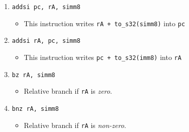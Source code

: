 \documentclass{article}
\begin{document}
\begin{itemize}
\begin{enumerate}
			\item \texttt{addsi pc, rA, simm8}
				\begin{itemize}
				\item This instruction writes \texttt{rA + to\_s32(simm8)}
					into \texttt{pc}
				\end{itemize}
			\item \texttt{addsi rA, pc, simm8}
				\begin{itemize}
				\item This instruction writes \texttt{pc + to\_s32(imm8)}
					into \texttt{rA}
				\end{itemize}

			\item \texttt{bz rA, simm8}
				\begin{itemize}
				\item Relative branch if \texttt{rA} is \textit{zero}.
				\end{itemize}
			\item \texttt{bnz rA, simm8}
				\begin{itemize}
				\item Relative branch if \texttt{rA} is \textit{non-zero}.
				\end{itemize}
			\end{enumerate}
		\end{itemize}
\end{document}
